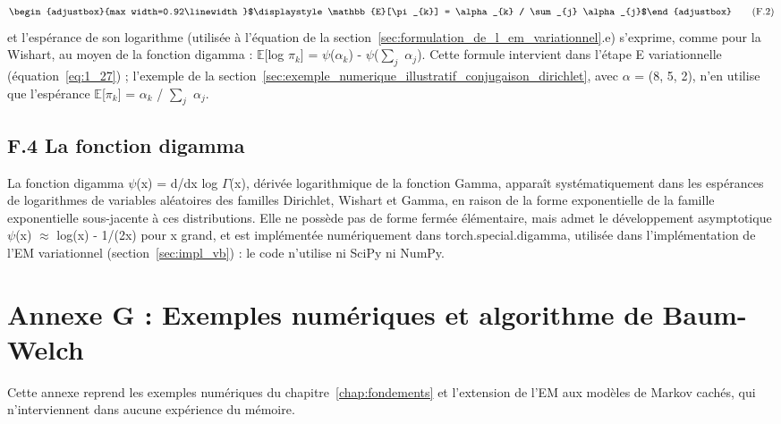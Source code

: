 \begin{equation}
\begin{adjustbox}{max width=0.92\linewidth}$\displaystyle \mathbb{E}[\pi _{k}] = \alpha _{k} / \sum_{j} \alpha _{j}$\end{adjustbox}
\tag{F.2}
\label{eq:G_2}
\end{equation}
et l'espérance de son logarithme (utilisée à l'équation de la section~\ref{sec:formulation_de_l_em_variationnel}.e) s'exprime, comme pour la Wishart, au moyen de la fonction digamma : $\mathbb{E}$[log $\pi _{k}$] = $\psi $($\alpha _{k}$) - $\psi $($\sum_{j}$ $\alpha _{j}$). Cette formule intervient dans l'étape E variationnelle (équation~\ref{eq:1_27}) ; l'exemple de la section~\ref{sec:exemple_numerique_illustratif_conjugaison_dirichlet}, avec $\alpha $ = (8, 5, 2), n'en utilise que l'espérance $\mathbb{E}$[$\pi _{k}$] = $\alpha _{k}$ / $\sum_{j}$ $\alpha _{j}$.

\subsection*{F.4 La fonction digamma}
La fonction digamma $\psi $(x) = d/dx log $\Gamma $(x), dérivée logarithmique de la fonction Gamma, apparaît systématiquement dans les espérances de logarithmes de variables aléatoires des familles Dirichlet, Wishart et Gamma, en raison de la forme exponentielle de la famille exponentielle sous-jacente à ces distributions. Elle ne possède pas de forme fermée élémentaire, mais admet le développement asymptotique $\psi $(x) $\approx $ log(x) - 1/(2x) pour x grand, et est implémentée numériquement dans torch.special.digamma, utilisée dans l'implémentation de l'EM variationnel (section~\ref{sec:impl_vb}) : le code n'utilise ni SciPy ni NumPy.

\section*{Annexe G : Exemples numériques et algorithme de Baum-Welch}
Cette annexe reprend les exemples numériques du chapitre~\ref{chap:fondements} et l'extension de l'EM aux modèles de Markov cachés, qui n'interviennent dans aucune expérience du mémoire.
\setcounter{subsection}{0}\renewcommand{\thesubsection}{G.\arabic{subsection}}\renewcommand{\theHsubsection}{G.\arabic{subsection}}
\setcounter{table}{0}\renewcommand{\thetable}{G.\arabic{table}}\renewcommand{\theHtable}{G.\arabic{table}}
\setcounter{figure}{0}\renewcommand{\thefigure}{G.\arabic{figure}}\renewcommand{\theHfigure}{G.\arabic{figure}}

